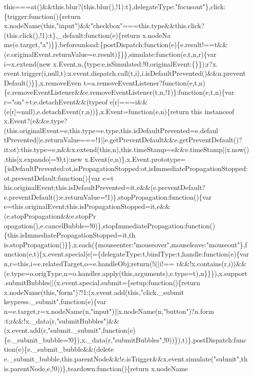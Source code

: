 \begin{DoxyCode}
{       this===at()&&this.blur?(this.blur(),!1):t\},delegateType:"focusout"\},click:\{trigger:function()\{return
       x.nodeName(this,"input")&&"checkbox"===this.type&&this.click?(this.click(),!1):t\},\_default:function(e)\{return
       x.nodeNa
      me(e.target,"a")\}\},beforeunload:\{postDispatch:function(e)\{e.result!==t&&(e.originalEvent.returnValue=e.result)\}\}\},simulate:function(e,t,n,r)\{var i=x.extend(new
       x.Event,n,\{type:e,isSimulated:!0,originalEvent:\{\}\});r?x.
      event.trigger(i,null,t):x.event.dispatch.call(t,i),i.isDefaultPrevented()&&n.preventDefault()\}\},x.removeEven
      t=a.removeEventListener?function(e,t,n)\{e.removeEventListener&&e.removeEventListener(t,n,!1)\}:function(e,t,n)\{var r="on"+t;e.detachEvent&&(typeof
       e[r]===i&&(e[r]=null),e.detachEvent(r,n))\},x.Event=function(e,n)\{return this instanceof
       x.Event?(e&&e.type?(this.originalEvent=e,this.type=e.type,this.isDefaultPrevented=e.defaul
      tPrevented||e.returnValue===!1||e.getPreventDefault&&e.getPreventDefault()?it:ot):this.type=e,n&&x.extend(this,n),this.timeStamp=e&&e.timeStamp||x.now(),this[x.expando]=!0,t):new
       x.Event(e,n)\},x.Event.prototype=\{isDefaultPrevented:ot,isPropagationStopped:ot,isImmediatePropagationStopped:ot,preventDefault:function()\{var
       e=t
      his.originalEvent;this.isDefaultPrevented=it,e&&(e.preventDefault?e.preventDefault():e.returnValue=!1)\},stopPropagation:function()\{var
       e=this.originalEvent;this.isPropagationStopped=it,e&&(e.stopPropagation&&e.stopPr
      opagation(),e.cancelBubble=!0)\},stopImmediatePropagation:function()\{this.isImmediatePropagationStopped=it,th
      is.stopPropagation()\}\},x.each(\{mouseenter:"mouseover",mouseleave:"mouseout"\},function(e,t)\{x.event.special[e]=\{delegateType:t,bindType:t,handle:function(e)\{var
       n,r=this,i=e.relatedTarget,o=e.handleObj;return(!i||i!==
      r&&!x.contains(r,i))&&(e.type=o.origType,n=o.handler.apply(this,arguments),e.type=t),n\}\}\}),x.support.submitBubbles||(x.event.special.submit=\{setup:function()\{return
       x.nodeName(this,"form")?!1:(x.event.add(this,"click.\_submit keypress.\_submit",function(e)\{var
       n=e.target,r=x.nodeName(n,"input")||x.nodeName(n,"button")?n.form
      :t;r&&!x.\_data(r,"submitBubbles")&&(x.event.add(r,"submit.\_submit",function(e)\{e.\_submit\_bubble=!0\}),x.\_data(r,"submitBubbles",!0))\}),t)\},postDispatch:function(e)\{e.\_submit\_bubble&&(delete
       e.\_submit\_bubble,this.parentNode&&!e.isTrigger&&x.event.simulate("submit",this.parentNode,e,!0))\},teardown:function()\{return
       x.nodeName
}
\end{DoxyCode}
